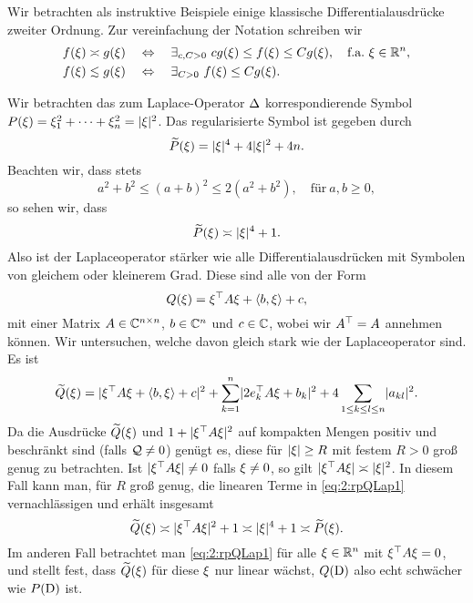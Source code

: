 Wir betrachten als instruktive Beispiele
einige klassische Differentialausdrücke zweiter Ordnung.
Zur vereinfachung der Notation schreiben wir
\begin{align}
f(\x)\asymp g(\x)\quad&\gdw\quad\exists_{c,C>0}~cg(\x)\leq f(\x)\leq Cg(\x),\quad\text{f.a.}~\x\in\R^n,\\
f(\x)\apprle g(\x)\quad&\gdw\quad\exists_{C>0}~f(\x)\leq Cg(\x).
\end{align}

\begin{exa}\label{exa:2:lap}
Wir betrachten das zum Laplace-Operator $\Delta$
korrespondierende Symbol $P(\xi)=\xi_1^2+\dots+\xi_n^2=\lvert\xi\rvert^2$.
Das regularisierte Symbol ist gegeben durch
\begin{equation}
\widetilde{P}(\xi)=\lvert\xi\rvert^4+4\lvert\xi\rvert^2+4n.
\end{equation}
Beachten wir, dass stets
\begin{equation}\label{eq:2:sqrest}
a^2+b^2\leq(a+b)^2\leq2(a^2+b^2),\quad\text{für}~a,b\geq0,
\end{equation}
so sehen wir, dass
\begin{equation}
\widetilde{P}(\xi)\asymp\lvert\xi\rvert^4+1.
\end{equation}
Also ist der Laplaceoperator stärker wie alle Differentialausdrücken
mit Symbolen von gleichem oder kleinerem Grad.
Diese sind alle von der Form
\begin{equation}
Q(\xi)=\xi^\top A\xi+\langle b,\xi\rangle+c,
\end{equation}
mit einer Matrix $A\in\mathbb C^{n\times n}$, $b\in\mathbb C^n$ und $c\in\mathbb C$,
wobei wir $A^\top=A$ annehmen können.
Wir untersuchen, welche davon gleich stark wie der Laplaceoperator sind.
Es ist
\begin{equation}\label{eq:2:rpQLap1}
\widetilde{Q}(\xi)=\lvert\xi^\top A\xi+\langle b,\xi\rangle+c\rvert^2+\sum_{k=1}^n\lvert2e^\top_kA\xi+b_k\rvert^2
+4\sum_{1\leq k\leq l\leq n}\lvert a_{kl}\rvert^2.
\end{equation}
Da die Ausdrücke $\widetilde{Q}(\xi)$ und $1+\lvert\xi^\top A\xi\rvert^2$
auf kompakten Mengen positiv und beschränkt sind (falls $\mathcal Q\neq0$) genügt es,
diese für $\lvert\xi\rvert\geq R$ mit festem $R>0$ groß genug zu betrachten.
Ist $\lvert\xi^\top A\xi\rvert\neq0$ falls $\xi\neq0$,
so gilt $\lvert\xi^\top A\xi\rvert\asymp\lvert\xi\rvert^2$.
In diesem Fall kann man, für $R$ groß genug,
die linearen Terme in \eqref{eq:2:rpQLap1} vernachlässigen
und erhält insgesamt
\begin{equation}
\widetilde{Q}(\xi)\asymp\lvert\xi^\top A\xi\rvert^2+1\asymp\lvert\xi\rvert^4+1\asymp\widetilde{P}(\xi).
\end{equation}
Im anderen Fall betrachtet man \eqref{eq:2:rpQLap1}
für alle $\xi\in\mathbb R^n$ mit $\xi^\top A\xi=0$,
und stellt fest, dass $\widetilde{Q}(\xi)$ für diese $\xi$ nur linear wächst,
$Q(\mathrm D)$ also echt schwächer wie $P(\mathrm D)$ ist.


\end{exa}
